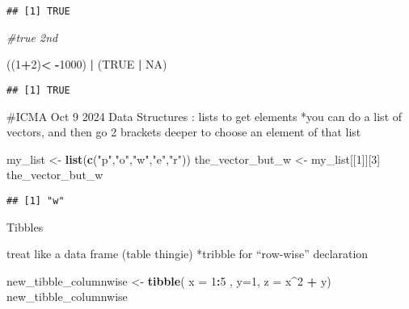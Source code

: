 \documentclass[
]{article}
\newenvironment{Shaded}{\begin{snugshade}}{\end{snugshade}}
\newcommand{\AttributeTok}[1]{\textcolor[rgb]{0.13,0.29,0.53}{#1}}
\newcommand{\CommentTok}[1]{\textcolor[rgb]{0.56,0.35,0.01}{\textit{#1}}}
\newcommand{\ConstantTok}[1]{\textcolor[rgb]{0.56,0.35,0.01}{#1}}
\newcommand{\DecValTok}[1]{\textcolor[rgb]{0.00,0.00,0.81}{#1}}
\newcommand{\FunctionTok}[1]{\textcolor[rgb]{0.13,0.29,0.53}{\textbf{#1}}}
\newcommand{\NormalTok}[1]{#1}
\newcommand{\OtherTok}[1]{\textcolor[rgb]{0.56,0.35,0.01}{#1}}
\newcommand{\SpecialCharTok}[1]{\textcolor[rgb]{0.81,0.36,0.00}{\textbf{#1}}}
\newcommand{\StringTok}[1]{\textcolor[rgb]{0.31,0.60,0.02}{#1}}
\begin{document}
\begin{verbatim}
## [1] TRUE
\end{verbatim}

\begin{Shaded}
\begin{Highlighting}[]
\CommentTok{\#true 2nd}
\end{Highlighting}
\end{Shaded}

\begin{Shaded}
\begin{Highlighting}[]
\NormalTok{((}\DecValTok{1}\SpecialCharTok{+}\DecValTok{2}\NormalTok{)}\SpecialCharTok{\textless{}} \SpecialCharTok{{-}}\DecValTok{1000}\NormalTok{) }\SpecialCharTok{|}\NormalTok{ (}\ConstantTok{TRUE} \SpecialCharTok{|} \ConstantTok{NA}\NormalTok{)}
\end{Highlighting}
\end{Shaded}

\begin{verbatim}
## [1] TRUE
\end{verbatim}

\#ICMA Oct 9 2024 Data Structures : lists to get elements *you can do a
list of vectors, and then go 2 brackets deeper to choose an element of
that list

\begin{Shaded}
\begin{Highlighting}[]
\NormalTok{my\_list }\OtherTok{\textless{}{-}} \FunctionTok{list}\NormalTok{(}\FunctionTok{c}\NormalTok{(}\StringTok{"p"}\NormalTok{,}\StringTok{"o"}\NormalTok{,}\StringTok{"w"}\NormalTok{,}\StringTok{"e"}\NormalTok{,}\StringTok{"r"}\NormalTok{))}
\NormalTok{the\_vector\_but\_w }\OtherTok{\textless{}{-}}\NormalTok{ my\_list[[}\DecValTok{1}\NormalTok{]][}\DecValTok{3}\NormalTok{]}
\NormalTok{the\_vector\_but\_w}
\end{Highlighting}
\end{Shaded}

\begin{verbatim}
## [1] "w"
\end{verbatim}

Tibbles

treat like a data frame (table thingie) *tribble for ``row-wise''
declaration

\begin{Shaded}
\begin{Highlighting}[]
\NormalTok{new\_tibble\_columnwise }\OtherTok{\textless{}{-}} \FunctionTok{tibble}\NormalTok{( }\AttributeTok{x  =} \DecValTok{1}\SpecialCharTok{:}\DecValTok{5}\NormalTok{ , }\AttributeTok{y=}\DecValTok{1}\NormalTok{, }\AttributeTok{z =}\NormalTok{ x}\SpecialCharTok{\^{}}\DecValTok{2} \SpecialCharTok{+}\NormalTok{ y)}
\NormalTok{new\_tibble\_columnwise}
\end{Highlighting}
\end{Shaded}
\end{document}
